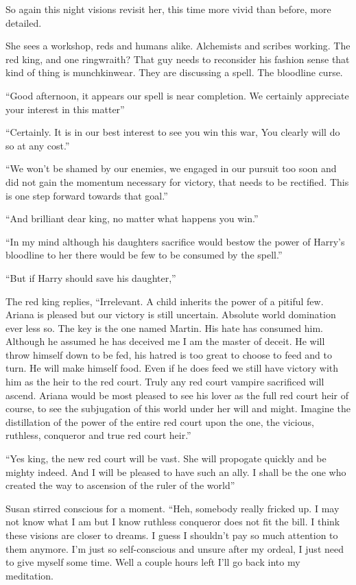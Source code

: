 So again this night visions revisit her, this time more vivid than before, more detailed.

She sees a workshop, reds and humans alike. Alchemists and scribes working. The red king, and one ringwraith? That guy needs to reconsider his fashion sense that kind of thing is munchkinwear. They are discussing a spell. The bloodline curse. 

``Good afternoon, it appears our spell is near completion. We certainly appreciate your interest in this matter''

``Certainly. It is in our best interest to see you win this war, You clearly will do so at any cost.''

``We won't be shamed by our enemies, we engaged in our pursuit too soon and did not gain the momentum necessary for victory, that needs to be rectified. This is one step forward towards that goal.''

``And brilliant dear king, no matter what happens you win.''

``In my mind although his daughters sacrifice would bestow the power of Harry's bloodline to her there would be few to be consumed by the spell.''

``But if Harry should save his daughter,''

The red king replies, ``Irrelevant. A child inherits the power of a pitiful few. Ariana is pleased but our victory is still uncertain. Absolute world domination ever less so. The key is the one named Martin. His hate has consumed him. Although he assumed he has deceived me I am the master of deceit. He will throw himself down to be fed, his hatred is too great to choose to feed and to turn. He will make himself food. Even if he does feed we still have victory with him as the heir to the red court. Truly any red court vampire sacrificed will ascend. Ariana would be most pleased to see his lover as the full red court heir of course, to see the subjugation of this world under her will and might. Imagine the distillation of the power of the entire red court upon the one, the vicious, ruthless, conqueror and true red court heir.''

``Yes king, the new red court will be vast. She will propogate quickly and be mighty indeed. And I will be pleased to have such an ally. I shall be the one who created the way to ascension of the ruler of the world''

Susan stirred conscious for a moment. ``Heh, somebody really fricked up. I may not know what I am but I know ruthless conqueror does not fit the bill. I think these visions are closer to dreams. I guess I shouldn't pay so much attention to them anymore. I'm just so self-conscious and unsure after my ordeal, I just need to give myself some time. Well a couple hours left I'll go back into my meditation.

